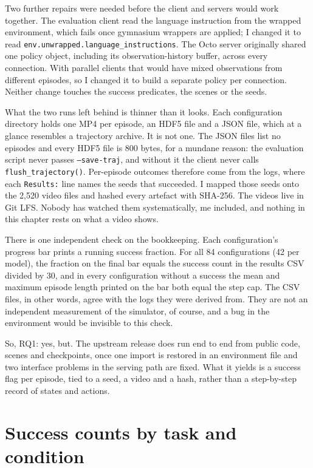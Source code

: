 Two further repairs were needed before the client and servers would work together. The evaluation client read the language instruction from the wrapped environment, which fails once gymnasium wrappers are applied; I changed it to read \texttt{env.unwrapped.language\_instructions}. The Octo server originally shared one policy object, including its observation-history buffer, across every connection. With parallel clients that would have mixed observations from different episodes, so I changed it to build a separate policy per connection. Neither change touches the success predicates, the scenes or the seeds.

What the two runs left behind is thinner than it looks. Each configuration directory holds one MP4 per episode, an HDF5 file and a JSON file, which at a glance resembles a trajectory archive. It is not one. The JSON files list no episodes and every HDF5 file is 800 bytes, for a mundane reason: the evaluation script never passes \texttt{--save-traj}, and without it the client never calls \texttt{flush\_trajectory()}. Per-episode outcomes therefore come from the logs, where each \texttt{Results:} line names the seeds that succeeded. I mapped those seeds onto the 2,520 video files and hashed every artefact with SHA-256. The videos live in Git LFS. Nobody has watched them systematically, me included, and nothing in this chapter rests on what a video shows.

There is one independent check on the bookkeeping. Each configuration's progress bar prints a running success fraction. For all 84 configurations (42 per model), the fraction on the final bar equals the success count in the results CSV divided by 30, and in every configuration without a success the mean and maximum episode length printed on the bar both equal the step cap. The CSV files, in other words, agree with the logs they were derived from. They are not an independent measurement of the simulator, of course, and a bug in the environment would be invisible to this check.

So, RQ1: yes, but. The upstream release does run end to end from public code, scenes and checkpoints, once one import is restored in an environment file and two interface problems in the serving path are fixed. What it yields is a success flag per episode, tied to a seed, a video and a hash, rather than a step-by-step record of states and actions.

\section{Success counts by task and condition}
\label{sec:main-results}

